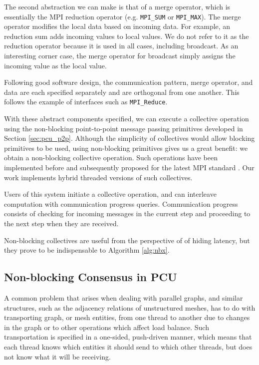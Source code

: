 The second abstraction we can make is that of a merge operator, which is
essentially the MPI reduction operator
(e.g. \texttt{MPI\_SUM} or \texttt{MPI\_MAX}).
The merge operator modifies the local data based on incoming data.
For example, an reduction sum adds incoming values to local values.
We do not refer to it as the reduction operator because it is used
in all cases, including broadcast.
As an interesting corner case, the merge operator for broadcast simply
assigns the incoming value as the local value.

Following good software design, the communication pattern,
merge operator, and data are each specified separately
and are orthogonal from one another.
This follows the example of interfaces such as \texttt{MPI\_Reduce}.

With these abstract components specified, we can execute a collective
operation
using the non-blocking point-to-point message passing primitives
developed in Section \ref{sec:pcu_p2p}.
Although the simplicity of collectives would allow blocking primitives
to be used, using non-blocking primitives gives us a great benefit:
we obtain a non-blocking collective operation.
Such operations have been implemented before \cite{hoefler2007implementation}
and subsequently proposed for the latest MPI standard \cite{hoefler2006non}.
Our work implements hybrid threaded versions of such collectives.

Users of this system initiate a collective operation, and can interleave
computation with communication progress queries.
Communication progress consists of checking for incoming messages in the current
step and proceeding to the next step when they are received.

Non-blocking collectives are useful from the perspective of
of hiding latency, but they prove to be indispensable to
Algorithm \ref{alg:nbx}.

\subsection{Non-blocking Consensus in PCU}
\label{sec:pcu_phased}

A common problem that arises when dealing with parallel graphs,
and similar structures, such as the adjacency relations of unstructured
meshes, has to do with transporting graph, or mesh entities, from
one thread to another
due to changes in the graph or to other operations which affect
load balance.
Such transportation is specified in a one-sided,
push-driven manner, which means that each thread knows which
entities it should send to which other threads, but does
not know what it will be receiving.

